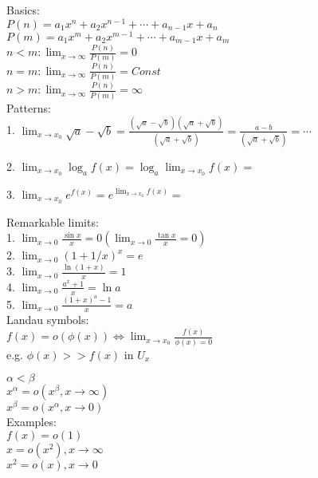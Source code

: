 \documentclass{letter}
\begin{document}
Basics: \\

$P(n)=a_1 x^n + a_2 x^{n-1} + \cdots + a_{n-1}x +  a_{n}$ \\
$P(m)=a_1 x^m + a_2 x^{m-1} + \cdots + a_{m-1}x +  a_{m}$ \\

$n < m: 
\lim_{x\to \infty} \frac{P(n)}{P(m)} = 0 $\\

$n = m: 
\lim_{x\to \infty} \frac{P(n)}{P(m)} = Const $\\

$n > m: 
\lim_{x\to \infty} \frac{P(n)}{P(m)} = \infty $\\


Patterns: \\
1. $\lim_{x\to x_0} \sqrt{a} - \sqrt{b} = 
\frac{(\sqrt{a} - \sqrt{b})(\sqrt{a} + \sqrt{b})}{(\sqrt{a} + \sqrt{b})} =
\frac{a - b}{(\sqrt{a} + \sqrt{b})}  = \cdots $

2. $ \lim_{x\to x_0} \log_a{f(x)} =  \log_a {\lim_{x\to x_0} {f(x)} } =  $

3. $ \lim_{x\to x_0} e^{f(x)} =  e^ {\lim_{x\to x_0} {f(x)} } =  $

Remarkable limits: \\
1. $ \lim_{x\to 0} \frac{\sin{x}}{x} = 0 (\lim_{x\to 0} \frac{\tan{x}}{x} = 0) $ \\
2. $ \lim_{x\to 0} (1 + 1/x)^x = e $ \\
3. $ \lim_{x\to 0} \frac{\ln{(1+x)}}{x} = 1 $ \\
4. $ \lim_{x\to 0} \frac{a^x + 1}{x} = \ln{a} $ \\
5. $ \lim_{x\to 0} \frac{(1 + x)^a - 1}{x} = a $ \\


Landau symbols: \\
$ f(x) = o( \phi(x) ) \Leftrightarrow \lim_{x\to x_0} \frac{f(x)}{\phi(x) = 0} $ \\
e.g. $\phi(x) >> f(x)$ in $U_x$

$ \alpha < \beta $ \\
$x^{\alpha} = o(x^{\beta}, x\to \infty ) $ \\
$x^{\beta} = o(x^{\alpha}, x\to 0 )$ \\

Examples: \\
$ f(x) = o( 1 ) $ \\
$ x = o( x^2 ), x\to \infty $ \\
$ x^2 = o( x ), x\to 0 $ \\
\end{document}
